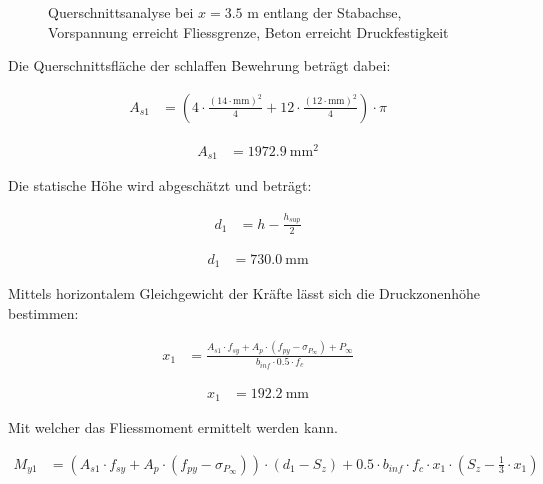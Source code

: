 \documentclass[
  11pt,
  letterpaper,
]{scrreprt}
\begin{document}
\begin{figure}[H]


\caption{\label{fig-t6_qs_My_pos}Querschnittsanalyse bei \(x=3.5\) m
entlang der Stabachse, Vorspannung erreicht Fliessgrenze, Beton erreicht
Druckfestigkeit}

\end{figure}%

Die Querschnittsfläche der schlaffen Bewehrung beträgt dabei:

$$
\begin{aligned}
A_{s1} &= \left( 4 \cdot \frac{ \left( 14 \cdot \mathrm{mm} \right) ^{ 2 } }{ 4 } + 12 \cdot \frac{ \left( 12 \cdot \mathrm{mm} \right) ^{ 2 } }{ 4 } \right) \cdot \pi \; 
\end{aligned}
$$

$$
\begin{aligned}
A_{s1} &= 1972.9\ \mathrm{mm}^{2} \;
\end{aligned}
$$

Die statische Höhe wird abgeschätzt und beträgt:

$$
\begin{aligned}
d_{1} &= h - \frac{ h_{sup} }{ 2 } \; 
\end{aligned}
$$

$$
\begin{aligned}
d_{1} &= 730.0\ \mathrm{mm} \;
\end{aligned}
$$

Mittels horizontalem Gleichgewicht der Kräfte lässt sich die
Druckzonenhöhe bestimmen:

$$
\begin{aligned}
x_{1} &= \frac{ A_{s1} \cdot f_{sy} + A_{p} \cdot \left( f_{py} - \sigma_{P_{\infty}} \right) + P_{\infty} }{ b_{inf} \cdot 0.5 \cdot f_{c} } \; 
\end{aligned}
$$

$$
\begin{aligned}
x_{1} &= 192.2\ \mathrm{mm} \;
\end{aligned}
$$

Mit welcher das Fliessmoment ermittelt werden kann.

$$
\begin{aligned}
M_{y1} &= \left( A_{s1} \cdot f_{sy} + A_{p} \cdot \left( f_{py} - \sigma_{P_{\infty}} \right) \right) \cdot \left( d_{1} - S_{z} \right) + 0.5 \cdot b_{inf} \cdot f_{c} \cdot x_{1} \cdot \left( S_{z} - \frac{ 1 }{ 3 } \cdot x_{1} \right) \; 
\end{aligned}
$$
\end{document}

